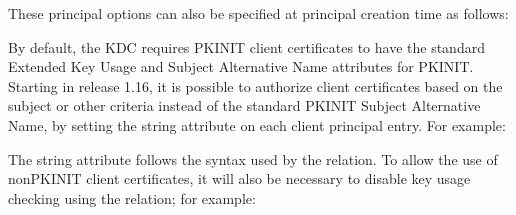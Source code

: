 \documentclass[letterpaper,10pt,english]{sphinxmanual}
\begin{document}
\begin{sphinxVerbatim}[commandchars=\\\{\}]
  
\end{sphinxVerbatim}

\sphinxAtStartPar
These principal options can also be specified at principal creation
time as follows:

\begin{sphinxVerbatim}[commandchars=\\\{\}]
  
\end{sphinxVerbatim}

\sphinxAtStartPar
By default, the KDC requires PKINIT client certificates to have the
standard Extended Key Usage and Subject Alternative Name attributes
for PKINIT.  Starting in release 1.16, it is possible to authorize
client certificates based on the subject or other criteria instead of
the standard PKINIT Subject Alternative Name, by setting the
 string attribute on each client principal entry.
For example:

\begin{sphinxVerbatim}[commandchars=\\\{\}]
    
\end{sphinxVerbatim}

\sphinxAtStartPar
The  string attribute follows the syntax used by
the {\hyperref[\detokenize{admin/conf_files/krb5_conf:krb5-conf-5}]{}}  relation.  To allow the
use of non\sphinxhyphen{}PKINIT client certificates, it will also be necessary to
disable key usage checking using the  relation;
for example:

\begin{sphinxVerbatim}[commandchars=\\\{\}]
\PYG{p}{[}\PYG{p}{]}
      
\end{sphinxVerbatim}
\end{document}
